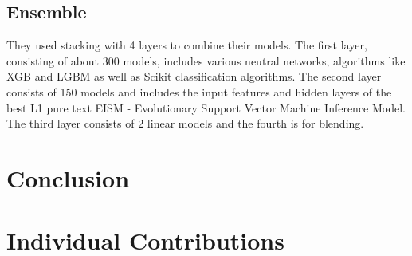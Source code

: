 \documentclass{article}
\begin{document}
\subsection{Ensemble}

They used stacking with 4 layers to combine their models. The first layer,
consisting of about 300 models, includes various neutral networks, algorithms
like XGB and LGBM as well as Scikit classification algorithms. The second layer
consists of 150 models and includes the input features and hidden layers of the
best L1 pure text EISM - Evolutionary Support Vector Machine Inference Model.
The third layer consists of 2 linear models and the fourth is for blending.

\section{Conclusion}

\appendix
\section*{Individual Contributions}
\end{document}
